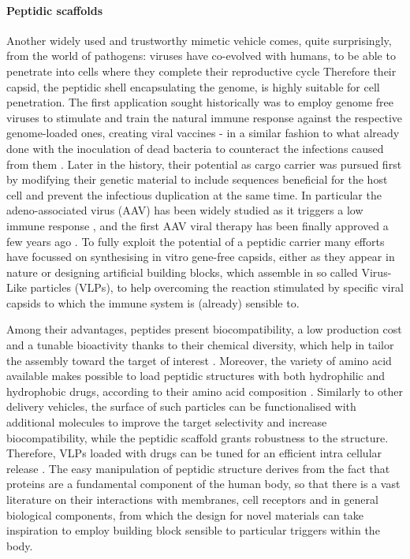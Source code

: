 \paragraph{Peptidic scaffolds} Another widely used and trustworthy mimetic vehicle comes, quite surprisingly, from the world of pathogens: viruses have co-evolved with humans, to be able to penetrate into cells where they complete their reproductive cycle \cite{Lobo2009} Therefore their capsid, the peptidic shell encapsulating the genome, is highly suitable for cell penetration. The first application sought historically was to employ genome free viruses to stimulate and train the natural immune response against the respective genome-loaded ones, creating viral vaccines - in a similar fashion to what already done with the inoculation of dead bacteria to counteract the infections caused from them \cite{Lauer2017}.
Later in the history, their potential as cargo carrier was pursued first by modifying their genetic material to include sequences beneficial for the host cell and prevent the infectious duplication at the same time. In particular the adeno-associated virus (AAV) has been widely studied \cite{Daya2008} as it triggers a low immune response \cite{Buning2015}, and the first AAV viral therapy has been finally approved a few years ago \cite{Smalley2017}.
%
To fully exploit the potential of a peptidic carrier many efforts have focussed on synthesising in vitro gene-free capsids, either as they appear in nature \cite{Wu2009} or designing artificial building blocks, which assemble in  so called Virus-Like particles (VLPs), to help overcoming the reaction stimulated by specific viral capsids to which the immune system is (already) sensible to.

Among their advantages, peptides present biocompatibility, a low production cost and a tunable bioactivity thanks to their chemical diversity, which help in tailor the assembly toward the target of interest \cite{Fan2017}. Moreover, the variety of amino acid available makes possible to load peptidic structures with both hydrophilic and hydrophobic drugs, according to their amino acid composition \cite{Habibi2016,Ma2012}.
%
Similarly to other delivery vehicles, the surface of such particles can be functionalised with additional molecules to improve the target selectivity and increase biocompatibility, while the peptidic scaffold grants robustness to the structure. Therefore, VLPs loaded with drugs can be tuned for an efficient intra cellular release \cite{Ma2012}.
%
The easy manipulation of peptidic structure derives from the fact that proteins are a fundamental component of the human body, so that there is a vast literature on their interactions with membranes, cell receptors and in general biological components, from which the design for novel materials can take inspiration to employ building block sensible to particular triggers within the body.

